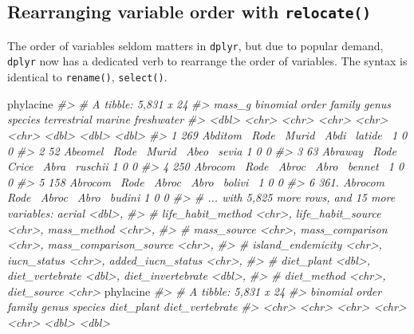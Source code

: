 \documentclass[]{book}
\newenvironment{Shaded}{}{}
\newcommand{\CommentTok}[1]{\textcolor[rgb]{0.38,0.63,0.69}{\textit{#1}}}
\newcommand{\DataTypeTok}[1]{\textcolor[rgb]{0.56,0.13,0.00}{#1}}
\newcommand{\KeywordTok}[1]{\textcolor[rgb]{0.00,0.44,0.13}{\textbf{#1}}}
\newcommand{\NormalTok}[1]{#1}
\newcommand{\OperatorTok}[1]{\textcolor[rgb]{0.40,0.40,0.40}{#1}}
\newcommand{\StringTok}[1]{\textcolor[rgb]{0.25,0.44,0.63}{#1}}
\begin{document}
\hypertarget{rearranging-variable-order-with-relocate}{%
\subsection{\texorpdfstring{Rearranging variable order with \texttt{relocate()}}{Rearranging variable order with relocate()}}\label{rearranging-variable-order-with-relocate}}

The order of variables seldom matters in \texttt{dplyr}, but due to popular demand,
\texttt{dplyr} now has a dedicated verb to rearrange the order of variables. The syntax
is identical to \texttt{rename()}, \texttt{select()}.

\begin{Shaded}
\begin{Highlighting}[]
\NormalTok{phylacine }\OperatorTok{%
\CommentTok{#> # A tibble: 5,831 x 24}
\CommentTok{#>   mass_g binomial order family genus species terrestrial marine freshwater}
\CommentTok{#>    <dbl> <chr>    <chr> <chr>  <chr> <chr>         <dbl>  <dbl>      <dbl>}
\CommentTok{#> 1   269  Abditom~ Rode~ Murid~ Abdi~ latide~           1      0          0}
\CommentTok{#> 2    52  Abeomel~ Rode~ Murid~ Abeo~ sevia             1      0          0}
\CommentTok{#> 3    63  Abraway~ Rode~ Crice~ Abra~ ruschii           1      0          0}
\CommentTok{#> 4   250  Abrocom~ Rode~ Abroc~ Abro~ bennet~           1      0          0}
\CommentTok{#> 5   158  Abrocom~ Rode~ Abroc~ Abro~ bolivi~           1      0          0}
\CommentTok{#> 6   361. Abrocom~ Rode~ Abroc~ Abro~ budini            1      0          0}
\CommentTok{#> # ... with 5,825 more rows, and 15 more variables: aerial <dbl>,}
\CommentTok{#> #   life_habit_method <chr>, life_habit_source <chr>, mass_method <chr>,}
\CommentTok{#> #   mass_source <chr>, mass_comparison <chr>, mass_comparison_source <chr>,}
\CommentTok{#> #   island_endemicity <chr>, iucn_status <chr>, added_iucn_status <chr>,}
\CommentTok{#> #   diet_plant <dbl>, diet_vertebrate <dbl>, diet_invertebrate <dbl>,}
\CommentTok{#> #   diet_method <chr>, diet_source <chr>}
\NormalTok{phylacine }\OperatorTok{%
\CommentTok{#> # A tibble: 5,831 x 24}
\CommentTok{#>   binomial order family genus species diet_plant diet_vertebrate}
\CommentTok{#>   <chr>    <chr> <chr>  <chr> <chr>        <dbl>           <dbl>}
}}
\end{Highlighting}
\end{Shaded}
\end{document}
